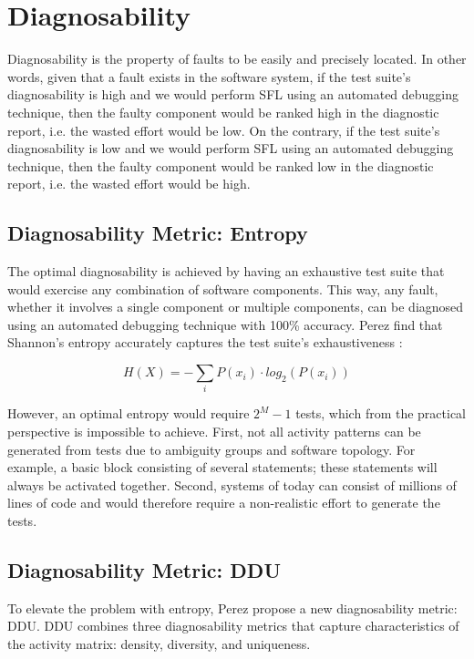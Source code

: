 \documentclass[twoside,a4paper,11pt]{memoir}
\begin{document}
\section{Diagnosability}
Diagnosability is the property of faults to be easily and precisely located.
In other words, given that a fault exists in the software system, if the test suite's diagnosability is high and we would perform SFL using an automated debugging technique, then the faulty component would be ranked high in the diagnostic report, i.e. the wasted effort would be low.
On the contrary, if the test suite's diagnosability is low and we would perform SFL using an automated debugging technique, then the faulty component would be ranked low in the diagnostic report, i.e. the wasted effort would be high.

\subsection{Diagnosability Metric: Entropy}
The optimal diagnosability is achieved by having an exhaustive test suite that would exercise any combination of software components.
This way, any fault, whether it involves a single component or multiple components, can be diagnosed using an automated debugging technique with 100\% accuracy.
Perez \etal find that Shannon's entropy accurately captures the test suite's exhaustiveness \cite{DBLP:conf/icse/PerezAD17}:

\begin{equation}
  H(X) = - \sum_i P(x_i) \cdot log_2(P(x_i))
\end{equation}

However, an optimal entropy would require $2^M -1$ tests, which from the practical perspective is impossible to achieve.
First, not all activity patterns can be generated from tests due to ambiguity groups and software topology.
For example, a basic block consisting of several statements; these statements will always be activated together.
Second, systems of today can consist of millions of lines of code and would therefore require a non-realistic effort to generate the tests.

\subsection{Diagnosability Metric: DDU}
To elevate the problem with entropy, Perez \etal \cite{DBLP:conf/icse/PerezAD17} propose a new diagnosability metric: DDU.
DDU combines three diagnosability metrics that capture characteristics of the activity matrix: density, diversity, and uniqueness.
\end{document}
